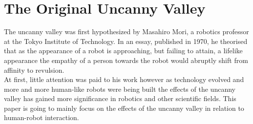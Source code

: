\chapter{The Original Uncanny Valley}
The uncanny valley was first hypothesized by Masahiro Mori, a robotics professor at the
Tokyo Institute of Technology. In an essay, published in 1970, he theorised that as the appearance of a robot 
is approaching, but failing to attain, a lifelike appearance the empathy of a person towards the robot would 
abruptly shift from affinity to revulsion.\\
At first, little attention was paid to his work however as technology evolved and more and more human-like robots were being
built the effects of the uncanny valley has gained more significance in robotics and other scientific fields. 
This paper is going to mainly focus on the effects of the uncanny valley in relation to human-robot interaction. \cite{6213238}

